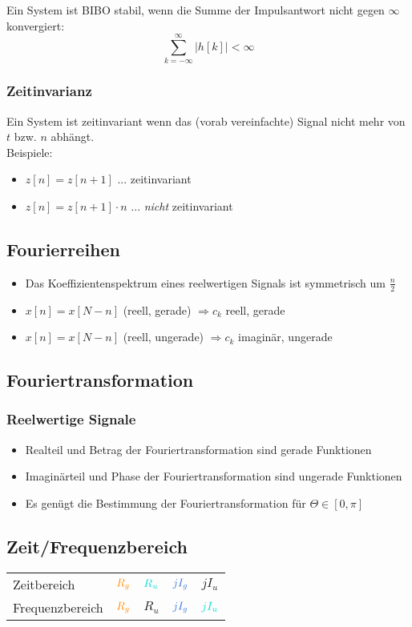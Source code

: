 \documentclass[a4paper, 12pt]{article}
\begin{document}
Ein System ist BIBO stabil, wenn die Summe der Impulsantwort nicht gegen $\infty$ konvergiert:
\[
    \sum_{k=-\infty}^{\infty} \left| h[k] \right| < \infty
\]

\subsubsection{Zeitinvarianz}

Ein System ist zeitinvariant wenn das (vorab vereinfachte) Signal nicht mehr von $t$ bzw. $n$ abhängt.\\

Beispiele:
\begin{itemize}
  \item $z[n] = z[n+1]$ ... zeitinvariant
  \item $z[n] = z[n+1]·n$ ... \emph{nicht} zeitinvariant
\end{itemize}

\subsection{Fourierreihen}

\begin{itemize}
    \item Das Koeffizientenspektrum eines reelwertigen Signals ist symmetrisch um $\frac{n}{2}$
    \item $x[n] = x[N-n]$ (reell, gerade) $⇒c_k$ reell, gerade
    \item $x[n] = x[N-n]$ (reell, ungerade) $⇒c_k$ imaginär, ungerade
\end{itemize}

\subsection{Fouriertransformation}

\subsubsection{Reelwertige Signale}

\begin{itemize}
    \item Realteil und Betrag der Fouriertransformation sind gerade Funktionen
    \item Imaginärteil und Phase der Fouriertransformation sind ungerade Funktionen
    \item Es genügt die Bestimmung der Fouriertransformation für $Θ ∈ [0,π]$
\end{itemize}

\subsection{Zeit/Frequenzbereich}

\begin{tabular}{lllll}
    Zeitbereich &
    $\color{orange} R_g$  &
    $\color{turquoise} R_u$  &
    $\color{bluegray} jI_g$ &
    $jI_u$\\

    Frequenzbereich &
    $\color{orange} R_g$  &
    $R_u$  &
    $\color{bluegray}jI_g$ &
    $\color{turquoise}jI_u$\\
\end{tabular}
\end{document}
